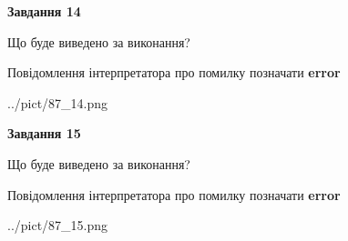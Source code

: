 \documentclass[11pt, ukrainian]{article}
\begin{document}
{\begin {large}
{\begin {center}\textbf{Завдання 14}\end {center}}\par
Що буде виведено за виконання? \par
Повідомлення інтерпретатора про помилку позначати \textbf{error}

\begin{center}
	{../pict/87_14.png}
\end{center}
\newpage

{\begin {center}\textbf{Завдання 15}\end {center}}\par
Що буде виведено за виконання? \par
Повідомлення інтерпретатора про помилку позначати \textbf{error}

\begin{center}
	{../pict/87_15.png}
\end{center}
\newpage

\end {large}}
\end{document}
